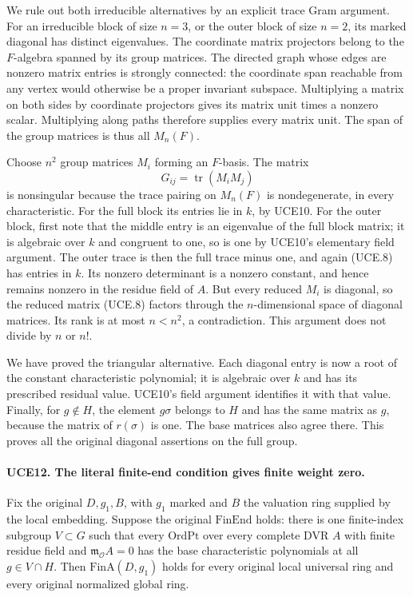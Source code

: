 \documentclass[11pt,a4paper]{article}
\numberwithin{equation}{section}
\theoremstyle{remark}\newtheorem{remark}[theorem]{Remark}
\begin{document}
We rule out both irreducible alternatives by an explicit trace
Gram argument.  For an irreducible block of size \(n=3\), or
the outer block of size \(n=2\), its marked diagonal has distinct
eigenvalues.  The coordinate matrix projectors belong to the
\(F\)-algebra spanned by its group matrices.  The directed graph
whose edges are nonzero matrix entries is strongly connected:
the coordinate span reachable from any vertex would otherwise be
a proper invariant subspace.  Multiplying a matrix on both sides
by coordinate projectors gives its matrix unit times a nonzero
scalar.  Multiplying along paths therefore supplies every matrix
unit.  The span of the group matrices is thus all \(M_n(F)\).

Choose \(n^2\) group matrices \(M_i\) forming an \(F\)-basis.
The matrix
\[
                     G_{ij}=\operatorname{tr}(M_iM_j)
 \tag{UCE.8}
\]
is nonsingular because the trace pairing on \(M_n(F)\) is
nondegenerate, in every characteristic.  For the full block its
entries lie in \(k\), by UCE10.  For the outer block, first note
that the middle entry is an eigenvalue of the full block matrix;
it is algebraic over \(k\) and congruent to one, so is one by
UCE10's elementary field argument.  The outer trace is then the
full trace minus one, and again (UCE.8) has entries in \(k\).
Its nonzero determinant is a nonzero constant, and hence remains
nonzero in the residue field of \(A\).  But every reduced \(M_i\)
is diagonal, so the reduced matrix (UCE.8) factors through the
\(n\)-dimensional space of diagonal matrices.  Its rank is at
most \(n<n^2\), a contradiction.  This argument does not divide
by \(n\) or \(n!\).

We have proved the triangular alternative.  Each diagonal entry
is now a root of the constant characteristic polynomial; it is
algebraic over \(k\) and has its prescribed residual value.
UCE10's field argument identifies it with that value.  Finally,
for \(g\notin H\), the element \(g\sigma\) belongs to
\(H\) and has the same matrix as \(g\), because the matrix
of \(r(\sigma)\) is one.  The base matrices also agree there.
This proves all the original diagonal assertions on the full group.

\paragraph{UCE12. The literal finite-end condition gives finite weight zero.}
\label{claim:UCE12}
Fix the original \(D,g_1,B\), with \(g_1\) marked and \(B\)
the valuation ring supplied by the local embedding.  Suppose the
original \(\mathrm{FinEnd}\) holds: there is one finite-index
subgroup \(V\subset G\) such that every \(\mathrm{OrdPt}\)
over every complete DVR \(A\) with finite residue field and
\(\mathfrak m_{\mathcal O}A=0\) has the base characteristic
polynomials at all \(g\in V\cap H\).
Then \(\mathrm{FinA}(D,g_1)\) holds for every original local
universal ring and every original normalized global ring.
\end{document}

